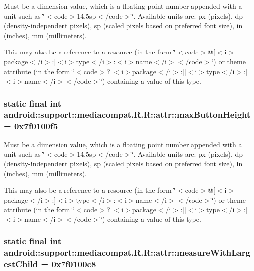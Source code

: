 Must be a dimension value, which is a floating point number appended with a unit such as \char`\"{}$<$code$>$14.5sp$<$/code$>$\char`\"{}. Available units are: px (pixels), dp (density-independent pixels), sp (scaled pixels based on preferred font size), in (inches), mm (millimeters). 

This may also be a reference to a resource (in the form \char`\"{}$<$code$>$@\mbox{[}$<$i$>$package$<$/i$>$:\mbox{]}$<$i$>$type$<$/i$>$:$<$i$>$name$<$/i$>$$<$/code$>$\char`\"{}) or theme attribute (in the form \char`\"{}$<$code$>$?\mbox{[}$<$i$>$package$<$/i$>$:\mbox{]}\mbox{[}$<$i$>$type$<$/i$>$:\mbox{]}$<$i$>$name$<$/i$>$$<$/code$>$\char`\"{}) containing a value of this type. \hypertarget{classandroid_1_1support_1_1mediacompat_1_1_r_1_1attr_ab46480afbce51e266e53532de37a7fe}{
\subsubsection[{maxButtonHeight}]{\setlength{\rightskip}{0pt plus 5cm}static final int android::support::mediacompat.R.R::attr::maxButtonHeight = 0x7f0100f5}}
\label{classandroid_1_1support_1_1mediacompat_1_1_r_1_1attr_ab46480afbce51e266e53532de37a7fe}


Must be a dimension value, which is a floating point number appended with a unit such as \char`\"{}$<$code$>$14.5sp$<$/code$>$\char`\"{}. Available units are: px (pixels), dp (density-independent pixels), sp (scaled pixels based on preferred font size), in (inches), mm (millimeters). 

This may also be a reference to a resource (in the form \char`\"{}$<$code$>$@\mbox{[}$<$i$>$package$<$/i$>$:\mbox{]}$<$i$>$type$<$/i$>$:$<$i$>$name$<$/i$>$$<$/code$>$\char`\"{}) or theme attribute (in the form \char`\"{}$<$code$>$?\mbox{[}$<$i$>$package$<$/i$>$:\mbox{]}\mbox{[}$<$i$>$type$<$/i$>$:\mbox{]}$<$i$>$name$<$/i$>$$<$/code$>$\char`\"{}) containing a value of this type. \hypertarget{classandroid_1_1support_1_1mediacompat_1_1_r_1_1attr_891ef086e2da37c7de16b89999737c65}{
\subsubsection[{measureWithLargestChild}]{\setlength{\rightskip}{0pt plus 5cm}static final int android::support::mediacompat.R.R::attr::measureWithLargestChild = 0x7f0100c8}}
\label{classandroid_1_1support_1_1mediacompat_1_1_r_1_1attr_891ef086e2da37c7de16b89999737c65}


